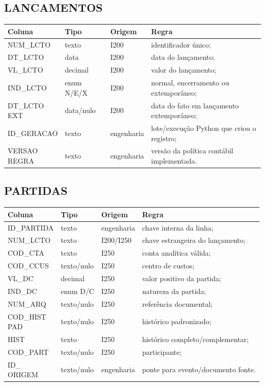 \documentclass[11pt,a4paper]{article}
\begin{document}
\subsection{LANCAMENTOS}

\begin{longtable}{p{} p{} p{} p{}}
\toprule
\textbf{Coluna} & \textbf{Tipo} & \textbf{Origem} & \textbf{Regra}\\
\midrule
NUM\_LCTO & texto & I200 & identificador único;\\
DT\_LCTO & data & I200 & data do lançamento;\\
VL\_LCTO & decimal & I200 & valor do lançamento;\\
IND\_LCTO & enum N/E/X & I200 & normal, encerramento ou extemporâneo;\\
\makecell[l]{DT\_LCTO\\ EXT} & data/nulo & I200 & data do fato em lançamento extemporâneo;\\
ID\_GERACAO & texto & engenharia & lote/execução Python que criou o registro;\\
\makecell[l]{VERSAO\\ REGRA} & texto & engenharia & versão da política contábil implementada.\\
\bottomrule
\end{longtable}

\subsection{PARTIDAS}

\begin{longtable}{p{} p{} p{} p{}}
\toprule
\textbf{Coluna} & \textbf{Tipo} & \textbf{Origem} & \textbf{Regra}\\
\midrule
ID\_PARTIDA & texto & engenharia & chave interna da linha;\\
NUM\_LCTO & texto & I200/I250 & chave estrangeira do lançamento;\\
COD\_CTA & texto & I250 & conta analítica válida;\\
COD\_CCUS & texto/nulo & I250 & centro de custos;\\
VL\_DC & decimal & I250 & valor positivo da partida;\\
IND\_DC & enum D/C & I250 & natureza da partida;\\
NUM\_ARQ & texto/nulo & I250 & referência documental;\\
\makecell[l]{COD\_HIST\\ PAD} & texto/nulo & I250 & histórico padronizado;\\
HIST & texto & I250 & histórico completo/complementar;\\
COD\_PART & texto/nulo & I250 & participante;\\
\makecell[l]{ID\_\\ ORIGEM} & texto/nulo & engenharia & ponte para evento/documento fonte.\\
\bottomrule
\end{longtable}
\end{document}
